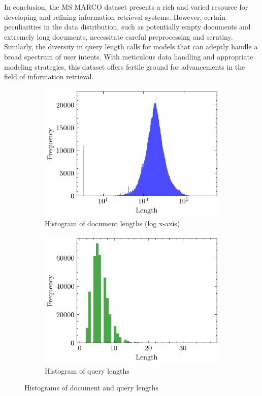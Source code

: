 \documentclass[11pt,a4paper]{article}
\begin{document}
In conclusion, the MS MARCO dataset presents a rich and varied
resource for developing and refining information retrieval systems.
However, certain peculiarities in the data distribution, such as
potentially empty documents and extremely long documents, necessitate
careful preprocessing and scrutiny. Similarly, the diversity in query
length calls for models that can adeptly handle a broad spectrum of
user intents. With meticulous data handling and appropriate modeling
strategies, this dataset offers fertile ground for advancements in
the field of information retrieval.
\begin{figure}[ht!]
    \centering
    \begin{subfigure}[b]{0.45\textwidth}
        \includegraphics[width=\textwidth]{../media/doc_lengths_histogram_log_x.png}
        \caption{Histogram of document lengths (log x-axis)}
    \end{subfigure}
    \hfill
    \begin{subfigure}[b]{0.45\textwidth}
        \includegraphics[width=\textwidth]{../media/query_lengths_histogram.png}
        \caption{Histogram of query lengths}
    \end{subfigure}
    \caption{Histograms of document and query lengths}
\end{figure}
\end{document}
